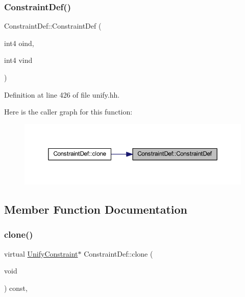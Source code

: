 \subsubsection{\texorpdfstring{ConstraintDef()}{ConstraintDef()}}
{\footnotesize\ttfamily Constraint\+Def\+::\+Constraint\+Def (\begin{DoxyParamCaption}\item[{int4}]{oind,  }\item[{int4}]{vind }\end{DoxyParamCaption})\hspace{0.3cm}{\ttfamily [inline]}}



Definition at line 426 of file unify.\+hh.

Here is the caller graph for this function\+:
\nopagebreak
\begin{figure}[H]
\begin{center}
\leavevmode
\includegraphics[width=350pt]{class_constraint_def_a25ccad5ea3493b2f17e03577a6075022_icgraph}
\end{center}
\end{figure}


\subsection{Member Function Documentation}
\mbox{\label{class_constraint_def_aae85758fdf38d79bdd086955afa57cde}} 
\subsubsection{\texorpdfstring{clone()}{clone()}}
{\footnotesize\ttfamily virtual \mbox{\hyperlink{class_unify_constraint}{Unify\+Constraint}}$\ast$ Constraint\+Def\+::clone (\begin{DoxyParamCaption}\item[{void}]{ }\end{DoxyParamCaption}) const\hspace{0.3cm}{\ttfamily [inline]}, {\ttfamily [virtual]}}



